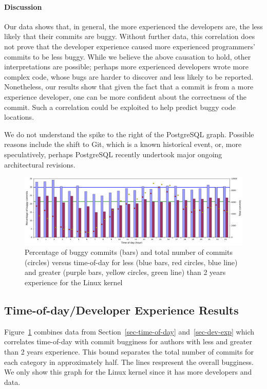 \paragraph{Discussion}

Our data shows that, in general, the more experienced the developers are, the
less likely that their commits are buggy.  Without further data, this
correlation does not prove that the developer experience caused more experienced
programmers' commits to be less buggy.  While we believe the above causation to
hold, other interpretations are possible; perhaps more experienced developers
wrote more complex code, whose bugs are harder to discover and less likely to be
reported.  Nonetheless, our results show that given the fact that a commit is
from a more experience developer, one can be more confident about the
correctness of the commit. Such a correlation could be exploited to help predict
buggy code locations.

We do not understand the spike to the right of the PostgreSQL graph.  Possible
reasons include the shift to Git, which is a known historical event, or, more
speculatively, perhaps PostgreSQL recently undertook major ongoing architectural
revisions.

\begin{figure}[tbh]
\includegraphics[width=\textwidth]{linux-bugginess-hour-experienced.pdf}
\caption{\label{fig-bugginess-experienced}Percentage of buggy commits (bars) and
  total number of commits (circles) versus time-of-day for less (blue bars, red
  circles, blue line) and greater (purple bars, yellow circles, green line) than
  2 years experience for the Linux kernel}
\end{figure}

\subsection{Time-of-day/Developer Experience Results}

Figure~\ref{fig-bugginess-experienced} combines data from
Section~\ref{sec-time-of-day} and~\ref{sec-dev-exp} which correlates time-of-day
with commit bugginess for authors with less and greater than 2 years
experience. This bound separates the total number of commits for each category
in approximately half. The lines respresent the overall bugginess. We only show
this graph for the Linux kernel since it has more developers and data.

